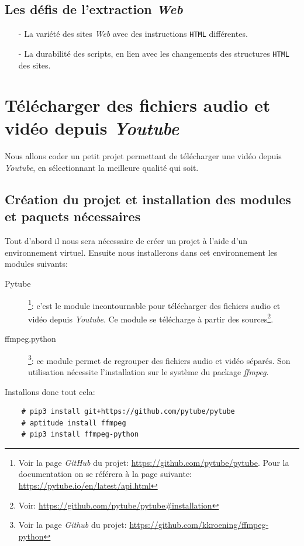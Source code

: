 \documentclass[a4paper,11pt]{book}
\begin{document}
\section{Les défis de l'extraction \textit{Web}}
\begin{itemize}
	\item[-] La variété des sites \textit{Web} avec des instructions \texttt{HTML} différentes.
	\item[-] La durabilité des scripts, en lien avec les changements des structures \texttt{HTML} des sites.
\end{itemize}
\medskip

\chapter{Télécharger des fichiers audio et vidéo depuis \textit{Youtube}}
Nous allons coder un petit projet permettant de télécharger une vidéo depuis \textit{Youtube}, en sélectionnant la meilleure qualité qui  soit.
\medskip

\section{Création du projet et installation des modules et paquets nécessaires}
Tout d'abord il nous sera nécessaire de créer un projet à l'aide d'un environnement virtuel. Ensuite nous installerons dans cet environnement les modules suivants:
\begin{description}
	\item[Pytube]\footnote{Voir la page \textit{GitHub} du projet: \url{https://github.com/pytube/pytube}. Pour la documentation on se référera à la page suivante: \url{https://pytube.io/en/latest/api.html}}: c'est le module incontournable pour télécharger des fichiers audio et vidéo depuis \textit{Youtube}. Ce module se télécharge à partir des sources\footnote{Voir: \url{https://github.com/pytube/pytube\#installation}}.
	\item[ffmpeg.python]\footnote{Voir la page \textit{Github} du projet: \url{https://github.com/kkroening/ffmpeg-python}}: ce module permet de regrouper des fichiers audio et vidéo séparés. Son utilisation nécessite l'installation sur le système du package \textit{ffmpeg}.
\end{description}
\medskip

Installons donc tout cela:
\begin{verbatim}
    # pip3 install git+https://github.com/pytube/pytube
    # aptitude install ffmpeg
    # pip3 install ffmpeg-python
\end{verbatim}
\medskip
\end{document}
